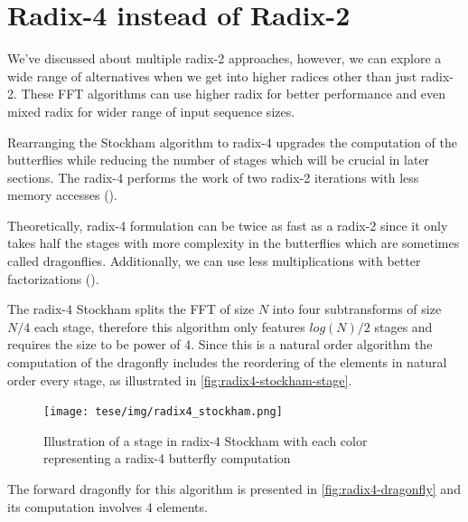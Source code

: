 \documentclass[
  oneside,
  11pt, a4paper,
  footinclude=true,
  headinclude=true,
  cleardoublepage=empty
]{scrbook}
\begin{document}
\section{Radix-4 instead of Radix-2} \label{subsec:radix4-instead-of-radix2}
We've discussed about multiple radix-2 approaches, however, we can explore a wide range of alternatives when we get into higher radices other than just radix-2. These FFT algorithms can use higher radix for better performance and even mixed radix \cite{singleton1969algorithm} for wider range of input sequence sizes.

Rearranging the Stockham algorithm to radix-4 upgrades the computation of the butterflies while reducing the number of stages which will be crucial in later sections.
The radix-4 performs the work of two radix-2 iterations with less memory accesses (\cite{bailey1988high}).

Theoretically, radix-4 formulation can be twice as fast as a radix-2 \cite{hussain2010evaluation} since it only takes half the stages with more complexity in the butterflies which are sometimes called dragonflies. Additionally, we can use less multiplications with better factorizations (\cite{marti2009radix}).

The radix-4 Stockham splits the FFT of size $N$ into four subtransforms of size $N/4$ each stage, therefore this algorithm only features $log(N)/2$ stages and requires the size to be power of 4. Since this is a natural order algorithm the computation of the dragonfly includes the reordering of the elements in natural order every stage, as illustrated in \autoref{fig:radix4-stockham-stage}.

\begin{figure}[h] 
    \centering
    \texttt{[image: tese/img/radix4\_stockham.png]}
    \caption{Illustration of a stage in radix-4 Stockham with each color representing a radix-4 butterfly computation}
    \label{fig:radix4-stockham-stage}
\end{figure}


The forward dragonfly for this algorithm is presented in \autoref{fig:radix4-dragonfly} and its computation involves 4 elements.
\end{document}
